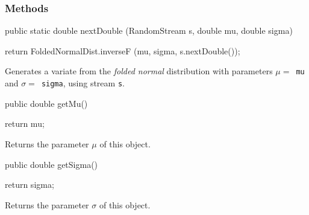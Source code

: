 \subsubsection* {Methods}
\begin{code}

   public static double nextDouble (RandomStream s, double mu, double sigma)\begin{hide} {
      return FoldedNormalDist.inverseF (mu, sigma, s.nextDouble());
   }\end{hide}
\end{code}
\begin{tabb} Generates a variate from the {\em folded normal\/} distribution with
 parameters $\mu = $~\texttt{mu} and $\sigma = $~\texttt{sigma},
   using stream \texttt{s}.
\end{tabb}
\begin{htmlonly}
\end{htmlonly}
\begin{code}

   public double getMu()\begin{hide} {
      return mu;
   }\end{hide}
\end{code}
  \begin{tabb} Returns the parameter $\mu$ of this object.
  \end{tabb}
\begin{htmlonly}
\end{htmlonly}
\begin{code}

   public double getSigma()\begin{hide} {
      return sigma;
   }\end{hide}
\end{code}
  \begin{tabb} Returns the parameter $\sigma$ of this object.
  \end{tabb}
\begin{htmlonly}
\end{htmlonly}
\begin{code}\begin{hide}

   protected void setParams (double mu, double sigma) {
      if (sigma <= 0.0)
         throw new IllegalArgumentException ("sigma <= 0");
      if (mu < 0.0)
         throw new IllegalArgumentException ("mu < 0");
      this.mu = mu;
      this.sigma = sigma;
   }
}\end{hide}
\end{code}
